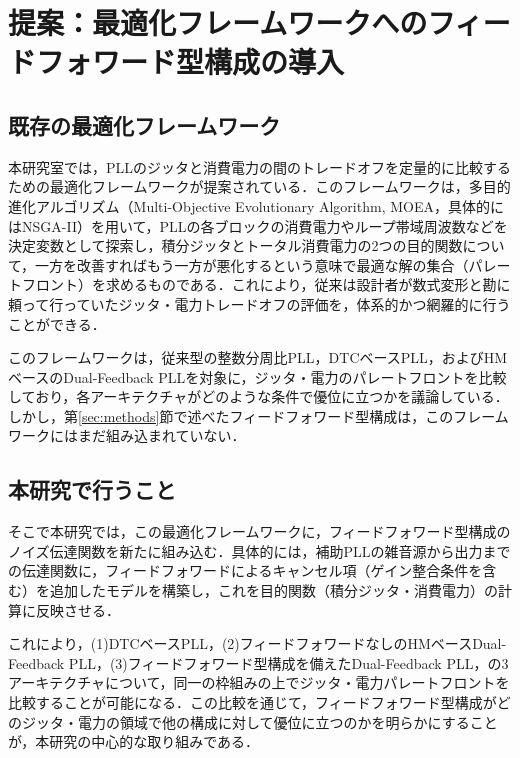 \section{提案：最適化フレームワークへのフィードフォワード型構成の導入}
\label{sec:proposal}

\subsection{既存の最適化フレームワーク}

本研究室では，PLLのジッタと消費電力の間のトレードオフを定量的に比較するための最適化フレームワークが提案されている\cite{zhu_moea_2025}．このフレームワークは，多目的進化アルゴリズム（Multi-Objective Evolutionary Algorithm, MOEA，具体的にはNSGA-II）を用いて，PLLの各ブロックの消費電力やループ帯域周波数などを決定変数として探索し，積分ジッタとトータル消費電力の2つの目的関数について，一方を改善すればもう一方が悪化するという意味で最適な解の集合（パレートフロント）を求めるものである．これにより，従来は設計者が数式変形と勘に頼って行っていたジッタ・電力トレードオフの評価を，体系的かつ網羅的に行うことができる．

このフレームワークは，従来型の整数分周比PLL，DTCベースPLL，およびHMベースのDual-Feedback PLLを対象に，ジッタ・電力のパレートフロントを比較しており，各アーキテクチャがどのような条件で優位に立つかを議論している．しかし，第\ref{sec:methods}節で述べたフィードフォワード型構成は，このフレームワークにはまだ組み込まれていない．

\subsection{本研究で行うこと}

そこで本研究では，この最適化フレームワークに，フィードフォワード型構成のノイズ伝達関数を新たに組み込む．具体的には，補助PLLの雑音源から出力までの伝達関数に，フィードフォワードによるキャンセル項（ゲイン整合条件を含む）を追加したモデルを構築し，これを目的関数（積分ジッタ・消費電力）の計算に反映させる．

これにより，(1)DTCベースPLL，(2)フィードフォワードなしのHMベースDual-Feedback PLL，(3)フィードフォワード型構成を備えたDual-Feedback PLL，の3アーキテクチャについて，同一の枠組みの上でジッタ・電力パレートフロントを比較することが可能になる．この比較を通じて，フィードフォワード型構成がどのジッタ・電力の領域で他の構成に対して優位に立つのかを明らかにすることが，本研究の中心的な取り組みである．

